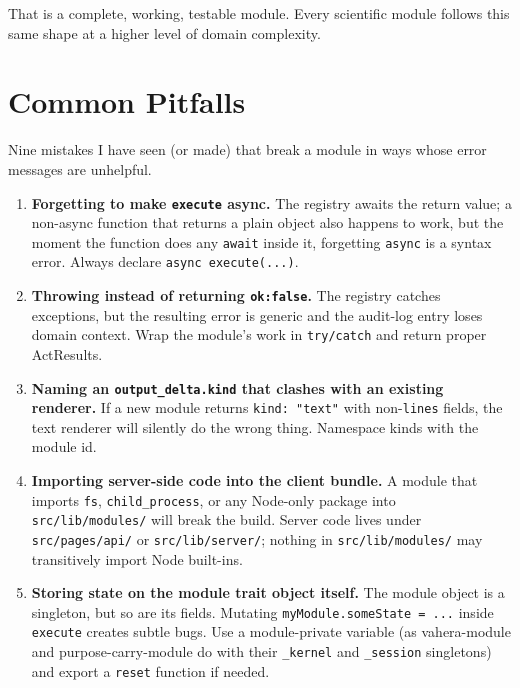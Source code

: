 \documentclass[11pt,a4paper]{article}
\theoremstyle{contract}
\begin{document}
That is a complete, working, testable module. Every scientific module
follows this same shape at a higher level of domain complexity.

\section{Common Pitfalls}
\label{sec:pitfalls}

Nine mistakes I have seen (or made) that break a module in ways whose
error messages are unhelpful.

\begin{enumerate}[leftmargin=1.6em,itemsep=2pt]
\item \textbf{Forgetting to make \texttt{execute} async.} The registry
awaits the return value; a non-async function that returns a plain
object also happens to work, but the moment the function does any
\texttt{await} inside it, forgetting \texttt{async} is a syntax error.
Always declare \texttt{async execute(...)}.

\item \textbf{Throwing instead of returning \texttt{ok:false}.} The
registry catches exceptions, but the resulting error is generic and the
audit-log entry loses domain context. Wrap the module's work in
\texttt{try/catch} and return proper ActResults.

\item \textbf{Naming an \texttt{output\_delta.kind} that clashes with an
existing renderer.} If a new module returns \texttt{kind: "text"} with
non-\texttt{lines} fields, the text renderer will silently do the wrong
thing. Namespace kinds with the module id.

\item \textbf{Importing server-side code into the client bundle.} A
module that imports \texttt{fs}, \texttt{child\_process}, or any
Node-only package into \texttt{src/lib/modules/} will break the build.
Server code lives under \texttt{src/pages/api/} or
\texttt{src/lib/server/}; nothing in \texttt{src/lib/modules/} may
transitively import Node built-ins.

\item \textbf{Storing state on the module trait object itself.} The
module object is a singleton, but so are its fields. Mutating
\texttt{myModule.someState = ...} inside \texttt{execute} creates
subtle bugs. Use a module-private variable (as vahera-module and
purpose-carry-module do with their \texttt{\_kernel} and \texttt{\_session}
singletons) and export a \texttt{reset} function if needed.


\end{enumerate}
\end{document}
